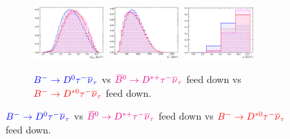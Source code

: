 \begin{figure}[!htb]
    \begin{subfigure}{\textwidth}
        \centering
        \includegraphics[width=0.3\textwidth]{figs-fit-fit-templates/histo-comp/D0_iso_D0Tau__vs__D0_iso_DstTau__vs__D0_iso_Dst0Tau__m2miss.pdf}
        \includegraphics[width=0.3\textwidth]{figs-fit-fit-templates/histo-comp/D0_iso_D0Tau__vs__D0_iso_DstTau__vs__D0_iso_Dst0Tau__el.pdf}
        \includegraphics[width=0.3\textwidth]{figs-fit-fit-templates/histo-comp/D0_iso_D0Tau__vs__D0_iso_DstTau__vs__D0_iso_Dst0Tau__q2.pdf}

        \caption{
            $\textcolor{blue}{{{{B}^-}} \rightarrow {\ensuremath{{D}^0}}{\ensuremath{\tau^-}}{\ensuremath{{\overline{\nu}}_\tau}}}$
            vs
            $\textcolor{magenta}{{{\kern 0.18em\overline{\kern -0.18em B}}{}^0} \rightarrow {\ensuremath{{D}^{*+}}}{\ensuremath{\tau^-}}{\ensuremath{{\overline{\nu}}_\tau}}}$ feed down
            vs
            $\textcolor{red}{{{{B}^-}} \rightarrow {\ensuremath{{D}^{*0}}}{\ensuremath{\tau^-}}{\ensuremath{{\overline{\nu}}_\tau}}}$ feed down.
        }
        \label{fig:d0-sig-vs-d0-norm}
    \end{subfigure}


\end{figure}
